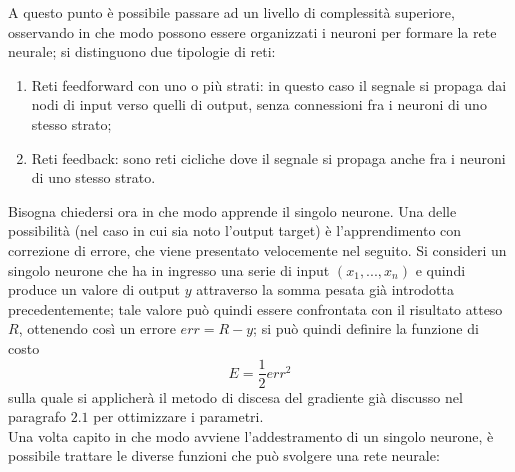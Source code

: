 A questo punto è possibile passare ad un livello di complessità superiore, osservando in che modo possono essere organizzati i neuroni per formare la rete neurale; si distinguono due tipologie di reti:
\begin{enumerate}
	\item Reti feedforward con uno o più strati: in questo caso il segnale si propaga dai nodi di input verso quelli di output, senza connessioni fra i neuroni di uno stesso strato;
	\item Reti feedback: sono reti cicliche dove il segnale si propaga anche fra i neuroni di uno stesso strato.
\end{enumerate}
Bisogna chiedersi ora in che modo apprende il singolo neurone. Una delle possibilità (nel caso in cui sia noto l'output target) è l'apprendimento con correzione di errore, che viene presentato velocemente nel seguito.
Si consideri un singolo neurone che ha in ingresso una serie di input $(x_1,...,x_n)$ e quindi produce un valore di output $y$ attraverso la somma pesata già introdotta precedentemente; tale valore può quindi essere confrontata con il risultato atteso $R$, ottenendo così un errore $err = R - y$; si può quindi definire la funzione di costo
\begin{equation}
E = \frac{1}{2}err^2
\end{equation}
sulla quale si applicherà il metodo di discesa del gradiente già discusso nel paragrafo $2.1$ per ottimizzare i parametri.\\
Una volta capito in che modo avviene l'addestramento di un singolo neurone, è possibile trattare le diverse funzioni che può svolgere una rete neurale:
